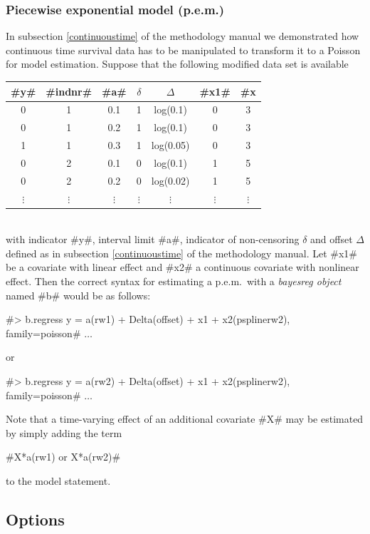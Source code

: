 \subsubsection*{Piecewise exponential model (p.e.m.)}

In subsection \ref*{continuoustime} of the methodology manual we
demonstrated how continuous time survival data has to be
manipulated to transform it to a Poisson for model estimation.
Suppose that the following modified data set is available
\vspace{0.5cm}\\
\begin{tabular}{c|c|c|c|c|c|c}
#y# & #indnr# & #a# & $\delta$ &  $\Delta$ &   #x1# &
#x#2\\\hline\hline
0 &  1 &   0.1 &   1  &  log(0.1) & 0  & 3\\
0  & 1   & 0.2  &  1  &  log(0.1) & 0 &  3\\
1  & 1   & 0.3  &  1  &  log(0.05)& 0  & 3\\\hline
0 &  2 &   0.1 &   0 &   log(0.1) & 1 &  5\\
0  & 2  &  0.2 &   0  &  log(0.02)& 1 &  5\\\hline
$\vdots$ & $\vdots$ & $\vdots$ & $\vdots$ & $\vdots$ & $\vdots$& $\vdots$\\
\end{tabular}
\vspace{0.5cm}\\
with indicator #y#, interval limit #a#, indicator of non-censoring
$\delta$ and offset $\Delta$ defined as in subsection
\ref*{continuoustime} of the methodology manual. Let #x1# be a
covariate with linear effect and #x2# a continuous covariate with
nonlinear effect. Then the correct syntax for estimating a
p.e.m.~with a {\em bayesreg object} named #b#  would be as
follows:

 #> b.regress y = a(rw1) + Delta(offset) + x1 + x2(psplinerw2), family=poisson# $\ldots$

or

 #> b.regress y = a(rw2) + Delta(offset) + x1 + x2(psplinerw2), family=poisson# $\ldots$


Note that a time-varying effect of an additional covariate #X# may
be estimated by simply adding the term

#X*a(rw1) or X*a(rw2)#

to the model statement.



\subsection{Options}
\label{mcmcregregressoptions}

